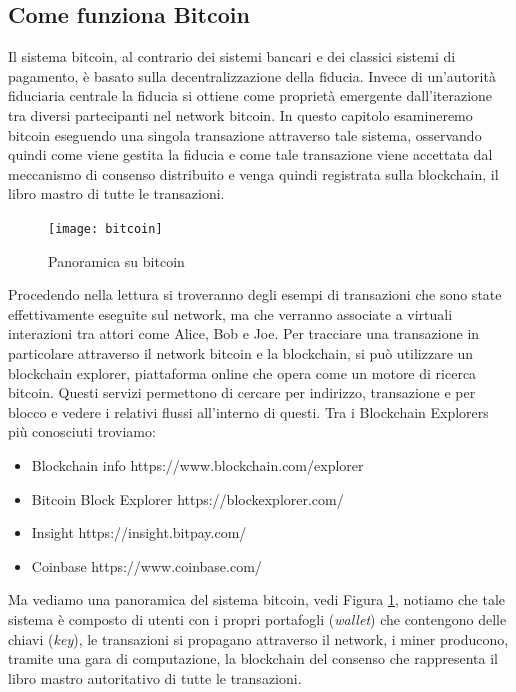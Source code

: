 \subsection{Come funziona Bitcoin}
Il sistema bitcoin, al contrario dei sistemi bancari e dei classici sistemi di pagamento, è basato sulla decentralizzazione della fiducia. Invece di un'autorità fiduciaria centrale la fiducia si ottiene come proprietà emergente dall'iterazione tra diversi partecipanti nel network bitcoin. In questo capitolo esamineremo bitcoin eseguendo una singola transazione attraverso tale sistema, osservando quindi come viene gestita la fiducia e come tale transazione viene accettata dal meccanismo di consenso distribuito e venga quindi registrata sulla blockchain, il libro mastro di tutte le transazioni.
\begin{figure}
	\centering 
	\texttt{[image: bitcoin]} 
	\caption[Panoramica su bitcoin]{Panoramica su bitcoin}
	\label{fig:panoramica-bitcoin} 
\end{figure}
Procedendo nella lettura si troveranno degli esempi di transazioni che sono state effettivamente eseguite sul network, ma che verranno associate a virtuali interazioni tra attori come Alice, Bob e Joe. Per tracciare una transazione in particolare attraverso il network bitcoin e la blockchain, si può utilizzare un blockchain explorer, piattaforma online che opera come un motore di ricerca bitcoin. Questi servizi permettono di cercare per indirizzo, transazione e per blocco e vedere i relativi flussi all'interno di questi.
Tra i Blockchain Explorers più conosciuti troviamo:
\begin{itemize}
	\item Blockchain info https://www.blockchain.com/explorer
	\item Bitcoin Block Explorer https://blockexplorer.com/
	\item Insight https://insight.bitpay.com/
	\item Coinbase https://www.coinbase.com/
\end{itemize} 
Ma vediamo una panoramica del sistema bitcoin, vedi Figura \ref{fig:panoramica-bitcoin}, notiamo che tale sistema è composto di utenti con i propri portafogli (\textit{wallet}) che contengono delle chiavi (\textit{key}), le transazioni si propagano attraverso il network, i miner producono, tramite una gara di computazione, la blockchain del consenso che rappresenta il libro mastro autoritativo di tutte le transazioni.

